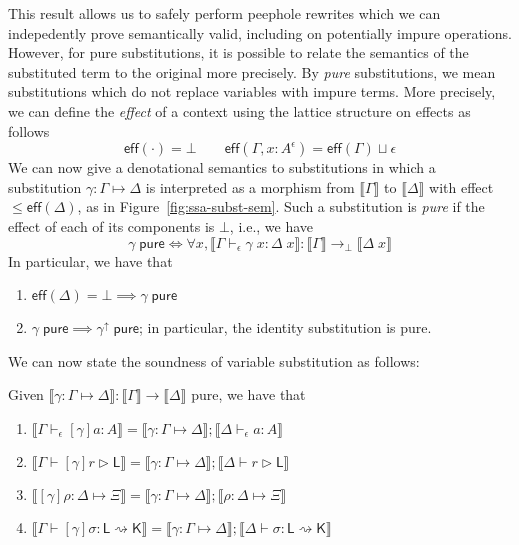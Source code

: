 \documentclass[acmsmall,screen,review]{acmart}
\newcommand{\ms}[1]{\ensuremath{\mathsf{#1}}}
\newcommand{\upg}[1]{{#1}^\uparrow}
\newcommand{\thyp}[3]{#1 : {#2}^{#3}}
\newcommand{\hasty}[4]{#1 \vdash_{#2} #3: {#4}}
\newcommand{\haslb}[3]{#1 \vdash #2 \rhd #3}
\newcommand{\issubst}[3]{#1: #2 \mapsto #3}
\newcommand{\lbsubst}[4]{#1 \vdash #2: #3 \rightsquigarrow #4}
\newcommand{\dnt}[1]{\llbracket{#1}\rrbracket}
\newcommand{\substpure}[1]{#1\;\ms{pure}}
\begin{document}
This result allows us to safely perform peephole rewrites which we can indepedently prove
semantically valid, including on potentially impure operations. However, for pure substitutions, it
is possible to relate the semantics of the substituted term to the original more precisely. By
\emph{pure} substitutions, we mean substitutions which do not replace variables with impure terms.
More precisely, we can define the \emph{effect} of a context using the lattice structure on effects
as follows
\begin{equation}
  \ms{eff}(\cdot) = \bot \qquad 
  \ms{eff}(\Gamma, \thyp{x}{A}{\epsilon}) = \ms{eff}(\Gamma) \sqcup \epsilon
\end{equation}
We can now give a denotational semantics to substitutions in which a substitution
$\issubst{\gamma}{\Gamma}{\Delta}$ is interpreted as a morphism from $\dnt{\Gamma}$ to
$\dnt{\Delta}$ with effect $\leq \ms{eff}(\Delta)$, as in Figure~\ref{fig:ssa-subst-sem}. Such a
substitution is \emph{pure} if the effect of each of its components is $\bot$, i.e., we have
\begin{equation}
  \substpure{\gamma} \iff \forall x, \dnt{\hasty{\Gamma}{\epsilon}{\gamma\;x}{\Delta\;x}} 
    : \dnt{\Gamma} \to_\bot \dnt{\Delta\;x}
\end{equation}
In particular, we have that
\begin{enumerate}
  \item $\ms{eff}(\Delta) = \bot \implies \substpure{\gamma}$
  \item $\substpure{\gamma} \implies \substpure{\upg{\gamma}}$; in particular, the identity
  substitution is pure.
\end{enumerate}
We can now state the soundness of variable substitution as follows:
\begin{theorem}[name=Soundness (Substitution), restate=soundnesssubst]
  Given $\dnt{\issubst{\gamma}{\Gamma}{\Delta}} : \dnt{\Gamma} \to \dnt{\Delta}$ pure, we have that
  \begin{enumerate}[label=(\alph*)]
    \item $\dnt{\hasty{\Gamma}{\epsilon}{[\gamma]a}{A}} 
      = \dnt{\issubst{\gamma}{\Gamma}{\Delta}};\dnt{\hasty{\Delta}{\epsilon}{a}{A}}$
      \label{itm:tm-subst-sound}
    \item $\dnt{\haslb{\Gamma}{[\gamma]r}{\ms{L}}}
      = \dnt{\issubst{\gamma}{\Gamma}{\Delta}};\dnt{\haslb{\Delta}{r}{\ms{L}}}$
    \item $\dnt{\issubst{[\gamma]\rho}{\Delta}{\Xi}}
      = \dnt{\issubst{\gamma}{\Gamma}{\Delta}};\dnt{\issubst{\rho}{\Delta}{\Xi}}$
    \item $\dnt{\lbsubst{\Gamma}{[\gamma]\sigma}{\ms{L}}{\ms{K}}}
      = \dnt{\issubst{\gamma}{\Gamma}{\Delta}};\dnt{\lbsubst{\Delta}{\sigma}{\ms{L}}{\ms{K}}}$
  \end{enumerate}
  \label{thm:subst-sound}
\end{theorem}
\end{document}

